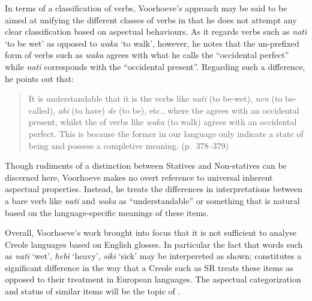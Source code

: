 In terms of a classification of verbs, Voorhoeve’s approach may be
said to be aimed at unifying the different classes of verbs in that he
does not attempt any clear classification based on aspectual
behaviours.  As it regards verbs such as \textit{nati} `to be wet' as
opposed to \textit{waka} `to walk', however, he notes that the
un-prefixed form of verbs such as \textit{waka} agrees with what he
calls the ``occidental perfect” while \textit{nati} corresponds with
the ``occidental present”.  Regarding such a difference, he points out
that:\largerpage

\begin{quote}
It is understandable that it is the verbs like \textit{nati} (to
be-wet), \textit{nen} (to be-called), \textit{abi} (to have)
\textit{de} (to be), etc., where the  agrees with an
occidental present, whilst the  of verbs like
\textit{waka} (to walk) agrees with an occidental perfect.  This is
because the former in our language only indicate a state of being and
possess a completive meaning. (p.~378--379)
\end{quote}

Though rudiments of a distinction between Statives and Non-statives
can be discerned here, Voorhoeve makes no overt reference to universal
inherent aspectual properties.  Instead, he treats the differences in
 interpretations between a bare verb like \textit{nati} and
\textit{waka} as ``understandable” or something that is natural based
on the language-specific meanings of these items.

Overall, Voorhoeve’s work brought into focus that it is not sufficient
to analyse Creole languages based on English glosses.  In particular
the fact that words such as \textit{nati} `wet', \textit{hebi}
`heavy', \textit{siki} `sick' may be interpereted as shown; constitutes a significant difference in
the way that a Creole such as SR treats these items as opposed to
their treatment in European languages.  The aspectual categorization
and status of similar items will be the topic of .

\subsection{\citet{Alleyne1980}}\label{sec:2.1.2}

